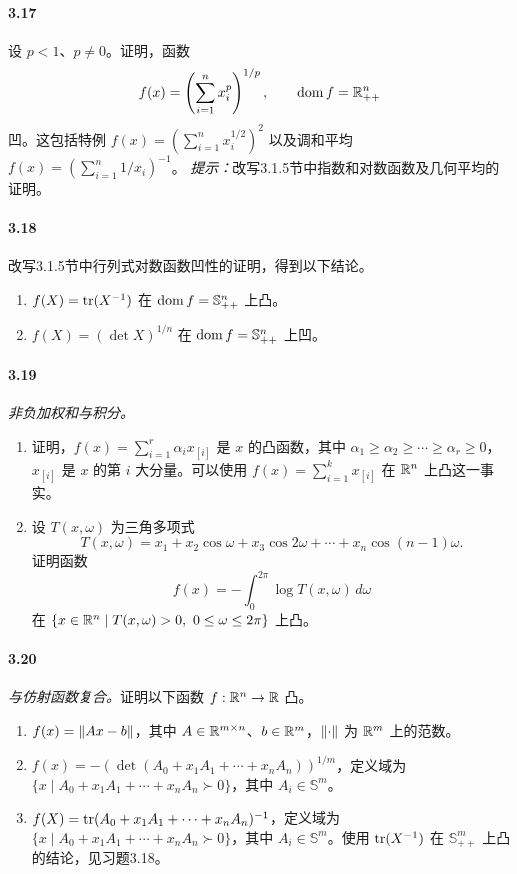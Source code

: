 \paragraph{3.17}设 $p<1$、$p\ne0$。证明，函数
\[f(x)=\left(\sum_{i=1}^n x_i^p\right)^{1/p},\qquad\operatorname{dom} f=\mathbb R_{++}^n\]
凹。这包括特例 $f(x)=(\sum_{i=1}^n x_i^{1/2})^2$ 以及调和平均 $f(x)=(\sum_{i=1}^n1/x_i)^{-1}$。
\textit{提示：}改写3.1.5节中指数和对数函数及几何平均的证明。
\paragraph{3.18}改写3.1.5节中行列式对数函数凹性的证明，得到以下结论。
\begin{enumerate}[label=(\alph*)]
\item $f(X)=\operatorname{tr}(X^{-1})$ 在 $\operatorname{dom} f=\mathbb S_{++}^n$ 上凸。
\item $f(X)=(\det X)^{1/n}$ 在 $\operatorname{dom} f=\mathbb S_{++}^n$ 上凹。
\end{enumerate}
\paragraph{3.19}\textit{非负加权和与积分。}
\begin{enumerate}[label=(\alph*)]
\item 证明，$f(x)=\sum_{i=1}^r\alpha_i x_{[i]}$ 是 $x$ 的凸函数，其中 $\alpha_1\geq\alpha_2\geq\cdots\geq\alpha_r\geq0$，$x_{[i]}$ 是 $x$ 的第 $i$ 大分量。可以使用 $f(x)=\sum_{i=1}^k x_{[i]}$ 在 $\mathbb R^n$ 上凸这一事实。
\item 设 $T(x,\omega)$ 为三角多项式
\[T(x,\omega)=x_1+x_2\cos\omega+x_3\cos2\omega+\cdots+x_n\cos(n-1)\omega.\]
证明函数
\[f(x)=-\int_0^{2\pi}\log T(x,\omega)\,d\omega\]
在 $\{x\in\R^n\mid T(x,\omega)>0,\ 0\leq\omega\leq2\pi\}$ 上凸。
\end{enumerate}
\paragraph{3.20}\textit{与仿射函数复合。}证明以下函数 $f:\mathbb R^n\to\mathbb R$ 凸。
\begin{enumerate}[label=(\alph*)]
\item $f(x)=\left\lVert Ax-b\right\rVert$，其中 $A\in\mathbb R^{m\times n}$、$b\in\mathbb R^m$，$\left\lVert \cdot\right\rVert$ 为 $\mathbb R^m$ 上的范数。
\item $f(x)=-(\det(A_0+x_1A_1+\cdots+x_nA_n))^{1/m}$，定义域为 $\{x\mid A_0+x_1A_1+\cdots+x_nA_n\succ0\}$，其中 $A_i\in\mathbb S^m$。
\item $f(X)=\operatorname{tr}(A_0+x_1A_1+\cdots+x_nA_n)^{-1}$，定义域为 $\{x\mid A_0+x_1A_1+\cdots+x_nA_n\succ0\}$，其中 $A_i\in\mathbb S^m$。使用 $\operatorname{tr}(X^{-1})$ 在 $\mathbb S_{++}^m$ 上凸的结论，见习题3.18。
\end{enumerate}
